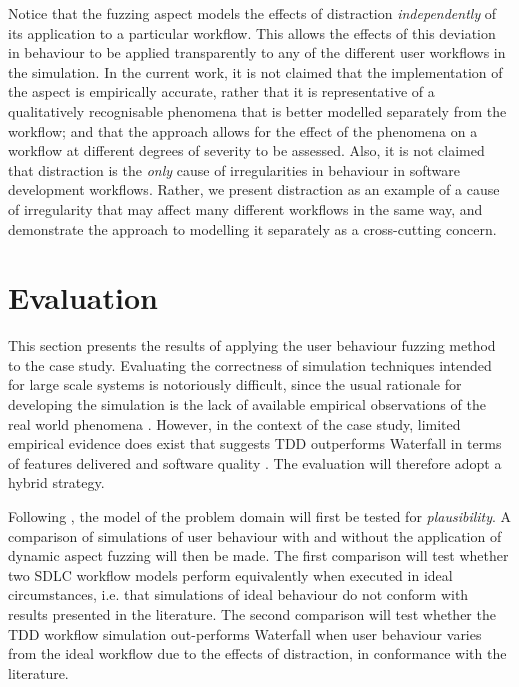 \documentclass{llncs}
\begin{document}
Notice that the fuzzing aspect models the effects of distraction \emph{independently} of its application to a particular
workflow.  This allows the effects of this deviation in behaviour to be applied transparently to any of the different
user workflows in the simulation. In the current work, it is not claimed that the implementation of the aspect is
empirically accurate, rather that it is representative of a qualitatively recognisable phenomena that is better modelled
separately from the workflow; and that the approach allows for the effect of the phenomena on a workflow at different
degrees of severity to be assessed.  Also, it is not claimed that distraction is the \emph{only} cause of irregularities in
behaviour in software development workflows.  Rather, we present distraction as an example of a cause of irregularity
that may affect many different workflows in the same way, and demonstrate the approach to modelling it separately as a
cross-cutting concern.
 

\section{Evaluation}
\label{sec:evaluation}


This section presents the results of applying the user behaviour fuzzing method to the case study.  Evaluating the
correctness of simulation techniques intended for large scale systems is notoriously difficult, since the usual
rationale for developing the simulation is the lack of available empirical observations of the real world phenomena
\cite{naylor67verification}.  However, in the context of the case study, limited empirical evidence does exist that
suggests TDD outperforms Waterfall in terms of features delivered and software quality
\citep{Bhat2006TestDrivenDevelopment,George2004TestDrivenDevelopment,Huang2009EmpiricalTestFirstProgramming}.  The
evaluation will therefore adopt a hybrid strategy.

Following \citet{naylor67verification}, the model of the problem domain will first be tested for \emph{plausibility}.  A
comparison of simulations of user behaviour with and without the application of dynamic aspect fuzzing will then be
made.  The first comparison will test whether two SDLC workflow models perform equivalently when executed in ideal
circumstances, i.e. that simulations of ideal behaviour do not conform with results presented in the literature. The
second comparison will test whether the TDD workflow simulation out-performs Waterfall when user behaviour varies from
the ideal workflow due to the effects of distraction, in conformance with the literature.
\end{document}
